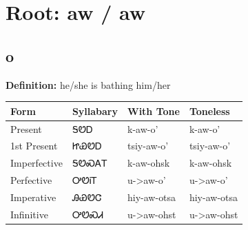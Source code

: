 \documentclass{article}%
\begin{document}
%
\normalsize%
\section*{Root: aw / aw}%
\subsection*{o}%
\textbf{Definition: }%
he/she is bathing him/her%
\\[0.5em]%
\begin{tabular}{|l|l|l|l|}%
\hline%
\textbf{Form}&\textbf{Syllabary}&\textbf{With Tone}&\textbf{Toneless}\\%
\hline%
Present&ᎦᏬᎠ&k{-}aw{-}o'&k{-}aw{-}o'\\%
1st Present&ᏥᏯᏬᎠ&tsiy{-}aw{-}o'&tsiy{-}aw{-}o'\\%
Imperfective&ᎦᏬᏍᎪᎢ&k{-}aw{-}ohsk&k{-}aw{-}ohsk\\%
Perfective&ᎤᏬᎥᎢ&u{-}>aw{-}o'&u{-}>aw{-}o'\\%
Imperative&ᎯᏯᏬᏣ&hiy{-}aw{-}otsa&hiy{-}aw{-}otsa\\%
Infinitive&ᎤᏬᏍᏗ&u{-}>aw{-}ohst&u{-}>aw{-}ohst\\%
\hline%
\end{tabular}%
\\[1em]%
\end{document}
